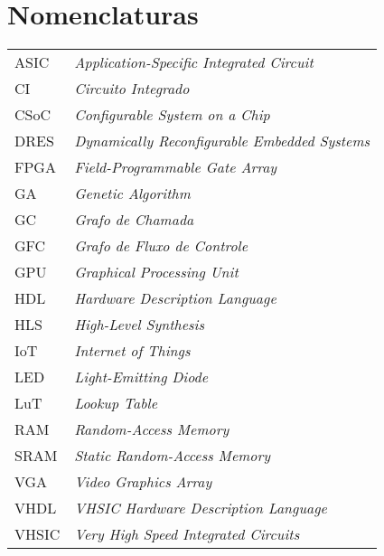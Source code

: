 
\chapter*{Nomenclaturas}


\begin{tabular*}{20cm}{lp{12cm}}
ASIC  & \textit{Application-Specific Integrated Circuit} \\
CI    & \textit{Circuito Integrado} \\
CSoC  & \textit{Configurable System on a Chip} \\
DRES  & \textit{Dynamically Reconfigurable Embedded Systems} \\
FPGA  & \textit{Field-Programmable Gate Array} \\
GA    & \textit{Genetic Algorithm} \\
GC    & \textit{Grafo de Chamada} \\
GFC   & \textit{Grafo de Fluxo de Controle} \\
GPU   & \textit{Graphical Processing Unit} \\
HDL   & \textit{Hardware Description Language} \\
HLS   & \textit{High-Level Synthesis} \\ 
IoT   & \textit{Internet of Things} \\
LED   & \textit{Light-Emitting Diode} \\
LuT   & \textit{Lookup Table} \\
RAM   & \textit{Random-Access Memory} \\
%
   SRAM  & \textit{Static Random-Access Memory} \\
   VGA   & \textit{Video Graphics Array} \\
   VHDL  & \textit{VHSIC Hardware Description Language} \\
   VHSIC & \textit{Very High Speed Integrated Circuits} \\
\end{tabular*}


